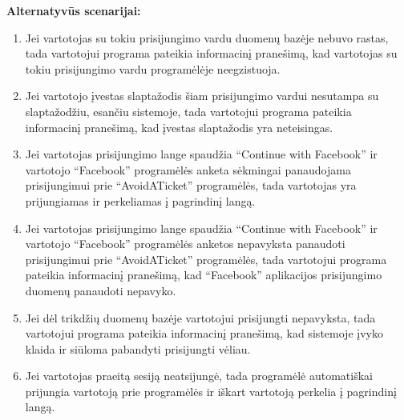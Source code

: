 \documentclass{VUMIFPSkursinis}
\begin{document}
	\textbf{Alternatyvūs scenarijai:}
	\begin{enumerate}[itemsep=-2mm]
		\item Jei vartotojas su tokiu prisijungimo vardu duomenų bazėje nebuvo rastas, tada vartotojui programa pateikia informacinį pranešimą, kad vartotojas su tokiu prisijungimo vardu programėlėje neegzistuoja.
		\item Jei vartotojo įvestas slaptažodis šiam prisijungimo vardui nesutampa su slaptažodžiu, esančiu sistemoje, tada vartotojui programa pateikia informacinį pranešimą, kad įvestas slaptažodis yra neteisingas.
		\item Jei vartotojas prisijungimo lange spaudžia “Continue with Facebook” ir vartotojo “Facebook” programėlės anketa sėkmingai panaudojama prisijungimui prie “AvoidATicket” programėlės, tada vartotojas yra prijungiamas ir perkeliamas į pagrindinį langą.
		\item Jei vartotojas prisijungimo lange spaudžia “Continue with Facebook” ir vartotojo “Facebook” programėlės anketos nepavyksta panaudoti prisijungimui prie “AvoidATicket” programėlės, tada vartotojui programa pateikia informacinį pranešimą, kad “Facebook” aplikacijos prisijungimo duomenų panaudoti nepavyko.
		\item Jei dėl trikdžių duomenų bazėje vartotojui prisijungti nepavyksta, tada vartotojui programa pateikia informacinį pranešimą, kad sistemoje įvyko klaida ir siūloma pabandyti prisijungti vėliau.
		\item Jei vartotojas praeitą sesiją neatsijungė, tada programėlė automatiškai prijungia vartotoją prie programėlės ir iškart vartotoją perkelia į pagrindinį langą.
	\end{enumerate} 
\end{document}
